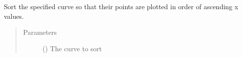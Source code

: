 \documentclass[letterpaper,10pt,english]{sphinxmanual}
\begin{document}

\begin{fulllineitems}
\label{\detokenize{pydv:pydvpy.sort}}
Sort the specified curve so that their points are plotted in order of ascending x values.

\begin{sphinxVerbatim}[commandchars=\\\{\}]
   
\end{sphinxVerbatim}

\begin{sphinxVerbatim}[commandchars=\\\{\}]
\end{sphinxVerbatim}
\begin{quote}\begin{description}
\item[{Parameters}] \leavevmode
{} ({\hyperref[\detokenize{pydv:curve.Curve}]{}}) \textendash{} The curve to sort

\end{description}\end{quote}

\end{fulllineitems}

\end{document}
